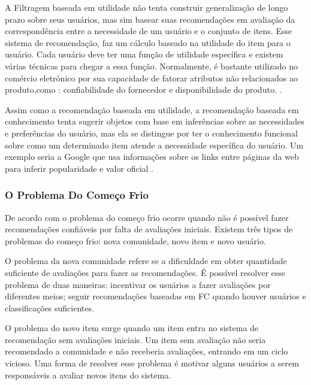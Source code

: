 
A Filtragem baseada em utilidade não tenta construir generalização de longo prazo sobre seus usuários, mas sim basear suas recomendações 
em avaliação da correspondência entre a necessidade de um usuário e o conjunto de itens.
Esse sistema de recomendação, faz um cálculo baseado na utilidade do item para o usuário.
Cada usuário deve ter uma função de utilidade específica e existem várias técnicas para chegar a essa função. Normalmente, é bastante utilizado no comércio eletrônico por sua capacidade de fatorar atributos não relacionados ao produto,como :
confiabilidade do fornecedor e disponibilidade do produto. \cite{burke2002}.


Assim como a recomendação baseada em utilidade, a recomendação baseada em conhecimento tenta sugerir objetos com base em inferências
sobre as necessidades e preferências do usuário, mas ela se distingue por ter o conhecimento funcional sobre 
como um determinado item atende a necessidade específica do usuário. Um exemplo seria 
a Google que usa informações sobre os links entre páginas da web para inferir popularidade e valor oficial \cite{burke2002}.


\subsubsection{O Problema Do Começo Frio}

De acordo com  o problema do começo frio ocorre quando não é possível fazer recomendações 
confiáveis por falta de avaliações iniciais. Existem três tipos de problemas do começo frio: nova comunidade, novo item e novo usuário. 

O problema da nova comunidade refere se a dificuldade em obter quantidade suficiente de avaliações para fazer as recomendações. É possível 
resolver esse problema de duas maneiras: incentivar os usuários a fazer avaliações por diferentes meios; seguir recomendações baseadas em FC 
quando houver usuários e classificações suficientes.

O problema do novo item surge quando um item entra no sistema de recomendação sem avaliações iniciais. 
Um item sem avaliação não seria recomendado a comunidade e não receberia avaliações, entrando em um ciclo vicioso. Uma forma 
de resolver esse problema é motivar alguns usuários a serem responsáveis a avaliar novos itens do sistema\cite{burke2002}. 

